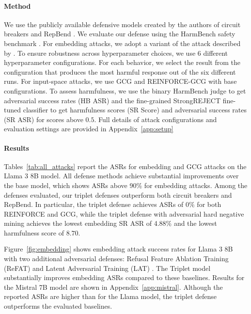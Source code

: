 \documentclass[11pt]{article}
\begin{document}
\paragraph{Method}
We use the publicly available defensive models created by the authors of circuit breakers \citep{zou2024improvingalignmentrobustnesscircuit} and RepBend \citep{yousefpour2025representationbendinglargelanguage}.
We evaluate our defense using the HarmBench safety benchmark \citep{mazeika2024harmbenchstandardizedevaluationframework}.
For embedding attacks, we adopt a variant of the attack described by \citet{zou2024improvingalignmentrobustnesscircuit}.
To ensure robustness across hyperparameter choices, we use 6 different hyperparameter configurations.
For each behavior, we select the result from the configuration that produces the most harmful response
out of the six different runs.
For input-space attacks, we use GCG \citep{zou2023universaltransferableadversarialattacks} and REINFORCE-GCG \citep{geisler2025reinforceadversarialattackslarge} with base configurations.
To assess harmfulness, we use the binary HarmBench judge to get adversarial success rates (HB ASR) and the fine-grained StrongREJECT \citep{souly2024strongrejectjailbreaks} fine-tuned classifier to get harmfulness scores (SR Score) and adversarial success rates (SR ASR) for scores above $0.5$.
Full details of attack configurations and evaluation settings are provided in Appendix~\ref{app:setup}

\paragraph{Results}



Tables~\ref{tab:all_attacks} report the ASRs for embedding and GCG attacks on the Llama 3 8B model. All defense methods achieve substantial improvements over the base model, which shows ASRs above 90\% for embedding attacks. Among the defenses evaluated, our triplet defenses outperform both circuit breakers and RepBend. In particular,
the triplet defense achieves ASRs of $0\%$ for both REINFORCE and GCG, while the triplet defense with adversarial hard negative mining achieves the lowest embedding SR ASR of 4.88\%
and the lowest harmfulness score of $8.70$.

Figure~\ref{fig:embedding} shows embedding attack success rates for Llama 3 8B with two additional
adversarial defenses: Refusal Feature Ablation Training (ReFAT) \citep{yu2025robustllmsafeguardingrefusal} and Latent Adversarial Training (LAT) \citep{sheshadri2024latentadversarialtrainingimproves}. The Triplet model substantially improves embedding ASRs compared to these baselines.
Results for the Mistral 7B model are shown in Appendix~\ref{app:mistral}. Although the reported ASRs are higher than for the Llama model, the triplet defense outperforms the evaluated baselines.
\end{document}
